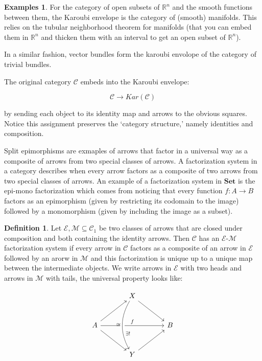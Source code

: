 \documentclass[11pt]{amsart}
\theoremstyle{plain}
\theoremstyle{definition}
\newtheorem{defn}[thm]{Definition}
\newtheorem*{egs*}{Examples}
\newcommand{\mR}{{\mathbb R}}
\newcommand{\cC}{{\mathcal C}}
\newcommand{\cE}{{\mathcal E}}
\newcommand{\cM}{{\mathcal M}}
\newcommand{\Set}{{\mathbf{Set}}}
\newcommand{\noi}{{\noindent}}
\begin{document}
\begin{egs*}
For the category of open subsets of $\mR^n$ and the smooth functions between them, the Karoubi envelope is the category of (smooth) manifolds. This relies on the tubular neighborhood theorem for manifolds (that you can embed them in $\mR^n$ and thicken them with an interval to get an open subset of $\mR^n$). \par

\noi In a similar fashion, vector bundles form the karoubi envolope of the category of trivial bundles. \par
\end{egs*}

The original category $\cC$ embeds into the Karoubi envelope: 

\[ \cC \to Kar(\cC) \]

\noi by sending each object to its identity map and arrows to the obvious squares. Notice this assignment preserves the `category structure{,}' namely identities and composition.\par 

Split epimorphisms are exmaples of arrows that factor in a universal way as a composite of arrows from two special classes of arrows. A factorization system in a category describes when every arrow factors as a composite of two arrows from two special classes of arrows. An example of a factorization system in $\Set$ is the epi-mono factorization which comes from noticing that every function $f: A \to B$ factors as an epimorphism (given by restricting its codomain to the image) followed by a monomorphism (given by including the image as a subset). 

\begin{defn}
Let $\cE, \cM \subseteq \cC_1$ be two classes of arrows that are closed under composition and both containing the identity arrows. Then $\cC$ has an $\cE$-$\cM$ factorization system if every arrow in $\cC$ factors as a composite of an arrow in $\cE$ followed by an arorw in $\cM$ and this factorization is unique up to a unique map between the intermediate objects. We write arrows in $\cE$ with two heads and arrows in $\cM$ with tails, the universal property looks like: 

\[\begin{tikzcd}[column sep = large, row sep= large]
  & X \ar[dr] & \\
  A \ar[ur] \ar[dr] \rar[rr, "f"] && B \\
  & Y \ar[ur]\ar[from=uu, bend right, crossing over, "\exists !" near end, "\cong"'] & 
\end{tikzcd}\]
\end{defn}
\end{document}
